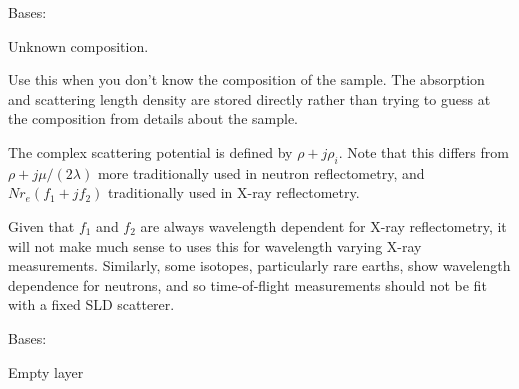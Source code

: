 \documentclass[letterpaper,10pt,english]{sphinxmanual}
\begin{document}
\begin{fulllineitems}
\label{api/material:refl1d.material.SLD}
Bases: {\hyperref[api/material:refl1d.material.Scatterer]{}}

Unknown composition.

Use this when you don't know the composition of the sample.  The
absorption and scattering length density are stored directly rather
than trying to guess at the composition from details about the sample.

The complex scattering potential is defined by $\rho + j \rho_i$.
Note that this differs from $\rho + j \mu/(2 \lambda)$ more
traditionally used in neutron reflectometry, and $N r_e (f_1 + j f_2)$
traditionally used in X-ray reflectometry.

Given that $f_1$ and $f_2$ are always wavelength dependent for X-ray
reflectometry, it will not make much sense to uses this for wavelength
varying X-ray measurements.  Similarly, some isotopes, particularly
rare earths, show wavelength dependence for neutrons, and so
time-of-flight measurements should not be fit with a fixed SLD scatterer.

\begin{fulllineitems}
\label{api/material:refl1d.material.SLD.parameters}
\end{fulllineitems}


\begin{fulllineitems}
\label{api/material:refl1d.material.SLD.sld}
\end{fulllineitems}


\end{fulllineitems}


\begin{fulllineitems}
\label{api/material:refl1d.material.Vacuum}
Bases: {\hyperref[api/material:refl1d.material.Scatterer]{}}

Empty layer

\begin{fulllineitems}
\label{api/material:refl1d.material.Vacuum.parameters}
\end{fulllineitems}


\begin{fulllineitems}
\label{api/material:refl1d.material.Vacuum.sld}
\end{fulllineitems}


\end{fulllineitems}
\end{document}
